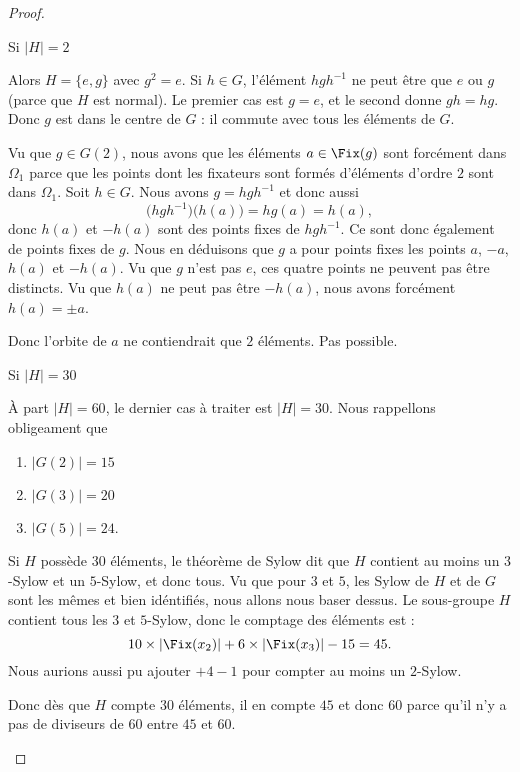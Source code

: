 \begin{proof}
\begin{subproof}
            \item[Si \( | H |=2\)]

                Alors \( H=\{ e,g \}\) avec \( g^2=e\). Si \( h\in G\), l'élément \( hgh^{-1}\) ne peut être que \( e\) ou \( g\) (parce que \( H\) est normal). Le premier cas est \( g=e\), et le second donne \( gh=hg\). Donc \( g\) est dans le centre de \( G\) : il commute avec tous les éléments de \( G\).

                Vu que \( g\in G(2)\), nous avons que les éléments \( a\in\Fix(g)\) sont forcément dans \( \Omega_1\) parce que les points dont les fixateurs sont formés d'éléments d'ordre \( 2\) sont dans \( \Omega_1\). Soit \( h\in G\). Nous avons \( g=hgh^{-1}\) et donc aussi
                \begin{equation}
                    \big( hgh^{-1} \big)\big( h(a) \big)=hg(a)=h(a),
                \end{equation}
                donc \( h(a)\) et \( -h(a)\) sont des points fixes de \( hgh^{-1}\). Ce sont donc également de points fixes de \( g\). Nous en déduisons que \( g\) a pour points fixes les points \( a\), \( -a\), \( h(a)\) et \( -h(a)\). Vu que \( g\) n'est pas \( e\), ces quatre points ne peuvent pas être distincts. Vu que \( h(a)\) ne peut pas être \( -h(a)\), nous avons forcément \( h(a)=\pm a\).

                Donc l'orbite de \( a\) ne contiendrait que \( 2\) éléments. Pas possible.

            \item[Si \( | H |=30\)]

               À part \( | H |=60\), le dernier cas à traiter est \( | H |=30\). Nous rappellons obligeament que
               \begin{enumerate}
                   \item
                       \( | G(2) |=15\)
                   \item
                       \( | G(3) |=20\)
                   \item
                       \( | G(5) |=24\).
               \end{enumerate}
               Si \( H\) possède \( 30\) éléments, le théorème de Sylow dit que \( H\) contient au moins un \( 3\)-Sylow et un \( 5\)-Sylow, et donc tous. Vu que pour \( 3\) et \( 5\), les Sylow de \( H\) et de \( G\) sont les mêmes et bien idéntifiés, nous allons nous baser dessus. Le sous-groupe \( H\) contient tous les \( 3\) et \( 5\)-Sylow, donc le comptage des éléments est :
                \begin{equation}
                    10\times | \Fix(x_2) |+6\times | \Fix(x_3) |-15=45.
                \end{equation}
                Nous aurions aussi pu ajouter \( +4-1\) pour compter au moins un \( 2\)-Sylow.

                Donc dès que \( H\) compte \( 30\) éléments, il en compte \( 45\) et donc \( 60\) parce qu'il n'y a pas de diviseurs de \( 60\) entre \( 45\) et \( 60\).

    \end{subproof}
    
\end{proof}

